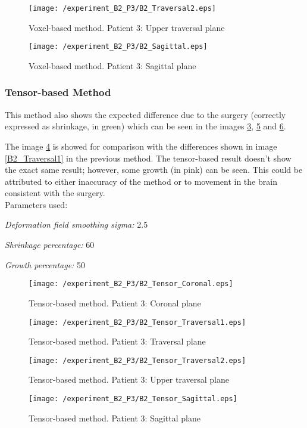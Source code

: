 \begin{figure}[H]
  \centering
  \texttt{[image: /experiment\_B2\_P3/B2\_Traversal2.eps]}
  \caption{Voxel-based method. Patient 3: Upper traversal plane}
  \label{B2_Traversal2}
\end{figure}

\begin{figure}[H]
  \centering
  \texttt{[image: /experiment\_B2\_P3/B2\_Sagittal.eps]}
  \caption{Voxel-based method. Patient 3: Sagittal plane}
  \label{B2_Sagittal}
\end{figure}


\subsubsection{Tensor-based Method}
This method also shows the expected difference due to the surgery
(correctly expressed as shrinkage, in green) which can be seen in the
images \ref{B2_TCoronal}, \ref{B2_TTraversal2} and \ref{B2_TSagittal}.

The image \ref{B2_TTraversal1} is showed for comparison with the
differences shown in image \ref{B2_Traversal1} in the previous
method. The tensor-based result doesn't show the exact same result;
however, some growth (in pink) can be seen. This could be attributed
to either inaccuracy of the method or to movement in the brain
consistent with the surgery.\\

Parameters used:
\begin{description}
\item \textit{Deformation field smoothing sigma:} 2.5
\item \textit{Shrinkage percentage:} 60
\item \textit{Growth percentage:} 50
\end{description}

\begin{figure}[H]
  \centering
  \texttt{[image: /experiment\_B2\_P3/B2\_Tensor\_Coronal.eps]}
  \caption{Tensor-based method. Patient 3: Coronal plane}
  \label{B2_TCoronal}
\end{figure}

\begin{figure}[H]
  \centering
  \texttt{[image: /experiment\_B2\_P3/B2\_Tensor\_Traversal1.eps]}
  \caption{Tensor-based method. Patient 3: Traversal plane}
  \label{B2_TTraversal1}
\end{figure}

\begin{figure}[H]
  \centering
  \texttt{[image: /experiment\_B2\_P3/B2\_Tensor\_Traversal2.eps]}
  \caption{Tensor-based method. Patient 3: Upper traversal plane}
  \label{B2_TTraversal2}
\end{figure}

\begin{figure}[H]
  \centering
  \texttt{[image: /experiment\_B2\_P3/B2\_Tensor\_Sagittal.eps]}
  \caption{Tensor-based method. Patient 3: Sagittal plane}
  \label{B2_TSagittal}
\end{figure}